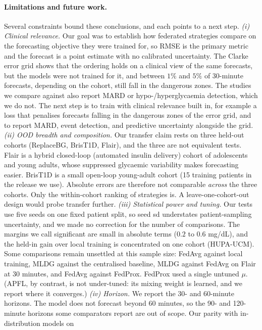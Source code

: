 \documentclass[10pt,letterpaper]{article}
\begin{document}
\paragraph{Limitations and future work.} Several constraints bound these
conclusions, and each points to a next step.
\emph{(i) Clinical relevance.} Our goal was to establish how federated
strategies compare on the forecasting objective they were trained for, so
RMSE is the primary metric and the forecast is a point estimate with no
calibrated uncertainty. The Clarke error grid shows that the ordering holds
on a clinical view of the same forecasts, but the models were not trained
for it, and between $1\%$ and $5\%$ of 30-minute forecasts, depending on the
cohort, still fall in the dangerous zones. The studies we compare against
also report MARD or hypo-/hyperglycaemia detection, which we do not. The
next step is to train with clinical relevance built in, for example a loss
that penalises forecasts falling in the dangerous zones of the error grid,
and to report MARD, event detection, and predictive uncertainty alongside
the grid.
\emph{(ii) OOD breadth and composition.} Our transfer claim rests on three
held-out cohorts (ReplaceBG, BrisT1D, Flair), and the three are not equivalent
tests. Flair is a hybrid closed-loop (automated insulin delivery) cohort of
adolescents and young adults, whose suppressed glycaemic variability makes
forecasting easier. BrisT1D is a small open-loop young-adult cohort (15
training patients in the release we use). Absolute errors are therefore not comparable \emph{across} the three
cohorts. Only the within-cohort ranking of strategies is. A leave-one-cohort-out
design would probe transfer further.
\emph{(iii) Statistical power and tuning.} Our tests use five seeds on one
fixed patient split, so seed sd understates patient-sampling uncertainty,
and we made no correction for the number of comparisons. The margins we call
significant are small in absolute terms ($0.2$ to $0.6$ mg/dL), and the
held-in gain over local training is concentrated on one cohort (HUPA-UCM).
Some comparisons remain unsettled at this sample size: FedAvg against local
training, MLDG against the centralised baseline, MLDG against FedAvg on
Flair at 30 minutes, and FedAvg against FedProx. FedProx used a single untuned $\mu$. (APFL, by
contrast, is not under-tuned: its mixing weight is learned, and we report
where it converges.)
\emph{(iv) Horizon.} We report the 30- and 60-minute horizons. The model does
not forecast beyond 60 minutes, so the 90- and 120-minute horizons some
comparators report are out of scope. Our parity with in-distribution models on
\end{document}
